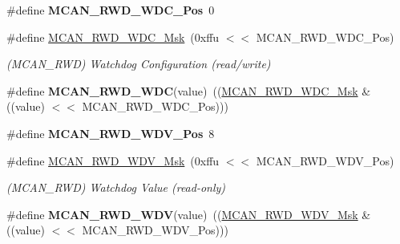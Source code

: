 \begin{DoxyCompactItemize}
\#define {\bfseries M\+C\+A\+N\+\_\+\+R\+W\+D\+\_\+\+W\+D\+C\+\_\+\+Pos}~0
\item 
\mbox{\label{group__SAMV71__MCAN_ga93fcc958bc3c793a45a2cf68687dd312}} 
\#define \mbox{\hyperlink{group__SAMV71__MCAN_ga93fcc958bc3c793a45a2cf68687dd312}{M\+C\+A\+N\+\_\+\+R\+W\+D\+\_\+\+W\+D\+C\+\_\+\+Msk}}~(0xffu $<$$<$ M\+C\+A\+N\+\_\+\+R\+W\+D\+\_\+\+W\+D\+C\+\_\+\+Pos)
\begin{DoxyCompactList}\small\item\em (M\+C\+A\+N\+\_\+\+R\+WD) Watchdog Configuration (read/write) \end{DoxyCompactList}\item 
\mbox{\label{group__SAMV71__MCAN_gae09ca54c5c887db91dbeddc345ec3019}} 
\#define {\bfseries M\+C\+A\+N\+\_\+\+R\+W\+D\+\_\+\+W\+DC}(value)~((\mbox{\hyperlink{group__SAMV71__MCAN_ga93fcc958bc3c793a45a2cf68687dd312}{M\+C\+A\+N\+\_\+\+R\+W\+D\+\_\+\+W\+D\+C\+\_\+\+Msk}} \& ((value) $<$$<$ M\+C\+A\+N\+\_\+\+R\+W\+D\+\_\+\+W\+D\+C\+\_\+\+Pos)))
\item 
\mbox{\label{group__SAMV71__MCAN_ga1edb34787ed9fb4270382611c740a726}} 
\#define {\bfseries M\+C\+A\+N\+\_\+\+R\+W\+D\+\_\+\+W\+D\+V\+\_\+\+Pos}~8
\item 
\mbox{\label{group__SAMV71__MCAN_gad8dc32b4087ccb131dccc05ba1871cdc}} 
\#define \mbox{\hyperlink{group__SAMV71__MCAN_gad8dc32b4087ccb131dccc05ba1871cdc}{M\+C\+A\+N\+\_\+\+R\+W\+D\+\_\+\+W\+D\+V\+\_\+\+Msk}}~(0xffu $<$$<$ M\+C\+A\+N\+\_\+\+R\+W\+D\+\_\+\+W\+D\+V\+\_\+\+Pos)
\begin{DoxyCompactList}\small\item\em (M\+C\+A\+N\+\_\+\+R\+WD) Watchdog Value (read-\/only) \end{DoxyCompactList}\item 
\mbox{\label{group__SAMV71__MCAN_gaff0e65ce33dacb630b2a0632570ee680}} 
\#define {\bfseries M\+C\+A\+N\+\_\+\+R\+W\+D\+\_\+\+W\+DV}(value)~((\mbox{\hyperlink{group__SAMV71__MCAN_gad8dc32b4087ccb131dccc05ba1871cdc}{M\+C\+A\+N\+\_\+\+R\+W\+D\+\_\+\+W\+D\+V\+\_\+\+Msk}} \& ((value) $<$$<$ M\+C\+A\+N\+\_\+\+R\+W\+D\+\_\+\+W\+D\+V\+\_\+\+Pos)))
\item 
\mbox{\label{group__SAMV71__MCAN_ga2d679ba6d4d15b01aae325f11eb9195c}} 

\end{DoxyCompactItemize}
